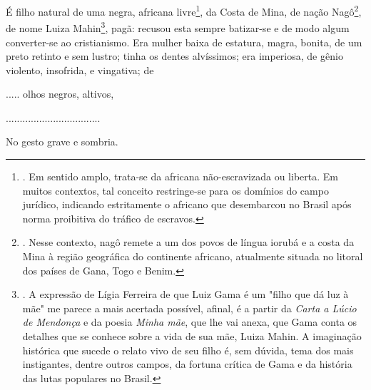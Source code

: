 É filho natural de uma negra, africana livre\footnote{. Em sentido
  amplo, trata-se da africana não-escravizada ou liberta. Em muitos
  contextos, tal conceito restringe-se para os domínios do campo
  jurídico, indicando estritamente o africano que desembarcou no Brasil
  após norma proibitiva do tráfico de escravos.}, da Costa de Mina, de
nação Nagô\footnote{. Nesse contexto, nagô remete a um dos povos de
  língua iorubá e a costa da Mina à região geográfica do continente
  africano, atualmente situada no litoral dos países de Gana, Togo e
  Benim.}, de nome Luiza Mahin\footnote{. A expressão de Lígia Ferreira
  de que Luiz Gama é um "filho que dá luz à mãe" me parece a mais
  acertada possível, afinal, é a partir da \emph{Carta a Lúcio de
  Mendonça} e da poesia \emph{Minha mãe}, que lhe vai anexa, que Gama
  conta os detalhes que se conhece sobre a vida de sua mãe, Luiza Mahin.
  A imaginação histórica que sucede o relato vivo de seu filho é, sem
  dúvida, tema dos mais instigantes, dentre outros campos, da fortuna
  crítica de Gama e da história das lutas populares no Brasil.}, pagã:
recusou esta sempre batizar-se e de modo algum converter-se ao
cristianismo. Era mulher baixa de estatura, magra, bonita, de um preto
retinto e sem lustro; tinha os dentes alvíssimos; era imperiosa, de
gênio violento, insofrida, e vingativa; de

..... olhos negros, altivos,

..................................

No gesto grave e sombria.


